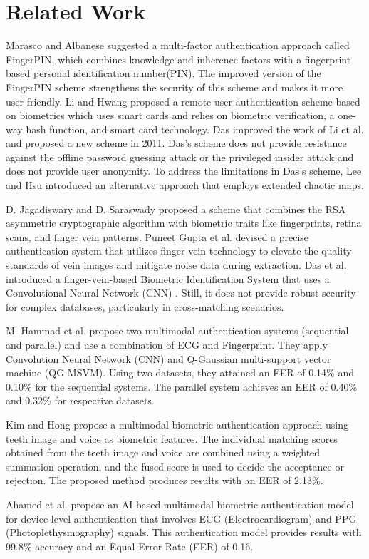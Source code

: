 \documentclass[10pt,journal,compsoc]{IEEEtran}
\begin{document}
\section{Related Work}
Marasco and Albanese \cite{IEEEtran37} suggested a multi-factor authentication approach called FingerPIN, which combines knowledge and inherence factors with a fingerprint-based personal identification number(PIN). The improved version of the FingerPIN scheme \cite{IEEEtran38} strengthens the security of this scheme and makes it more user-friendly. Li and Hwang \cite{IEEEtran32} proposed a remote user authentication scheme based on biometrics which uses smart cards and relies on biometric verification, a one-way hash function, and smart card technology. Das \cite{IEEEtran33} improved the work of Li et al. and proposed a new scheme in 2011. Das's scheme does not provide resistance against the offline password guessing attack or the privileged insider attack and does not provide user anonymity. To address the limitations in Das's scheme, Lee and Hsu \cite{IEEEtran56} introduced an alternative approach that employs extended chaotic maps.
\par D. Jagadiswary and D. Saraswady \cite{IEEEtran58} proposed a scheme that combines the RSA asymmetric cryptographic algorithm with biometric traits like fingerprints, retina scans, and finger vein patterns. Puneet Gupta et al. \cite{IEEEtran61} devised a precise authentication system that utilizes finger vein technology to elevate the quality standards of vein images and mitigate noise data during extraction. Das et al. introduced a finger-vein-based Biometric Identification System that uses a Convolutional Neural Network (CNN) \cite{IEEEtran62}. Still, it does not provide robust security for complex databases, particularly in cross-matching scenarios.
\par M. Hammad et al. \cite{r1} propose two multimodal authentication systems (sequential and parallel) and use a combination of ECG and Fingerprint. They apply Convolution Neural Network (CNN) and Q-Gaussian multi-support vector machine (QG-MSVM). Using two datasets, they attained an EER of 0.14\% and 0.10\% for the sequential systems. The parallel system achieves an EER of 0.40\% and 0.32\% for respective datasets.
 \par Kim and Hong \cite{r4} propose a multimodal biometric authentication approach using teeth image and voice as biometric features. The individual matching scores obtained from the teeth image and voice are combined using a weighted summation operation, and the fused score is used to decide the acceptance or rejection. The proposed method produces results with an EER of 2.13\%.
\par Ahamed et al. \cite{r2} propose an AI-based multimodal biometric authentication model for device-level authentication that involves ECG (Electrocardiogram) and PPG (Photoplethysmography) signals. This authentication model provides results with 99.8\% accuracy and an Equal Error Rate (EER) of 0.16.
\end{document}
